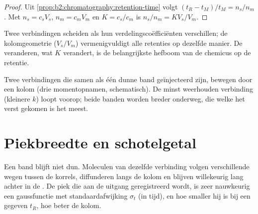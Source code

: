 \begin{proof}
Uit \cref{prop:b2:chromatography:retention-time} volgt $(t_R - t_M)/t_M = n_s/n_m$. Met $n_s = c_sV_s$,
$n_m = c_mV_m$ en $K = c_s/c_m$ is $n_s/n_m = KV_s/V_m$.
\end{proof}

Twee verbindingen scheiden als hun verdelingscoëfficiënten verschillen; de kolomgeometrie ($V_s/V_m$)
vermenigvuldigt alle retenties op dezelfde manier. De  veranderen, wat $K$ verandert, is de belangrijkste
hefboom van de chemicus op de retentie.

\begin{omfigure}
\par\vspace{4pt}

{\small Twee verbindingen die samen als één dunne band geïnjecteerd zijn, bewegen door een kolom (drie momentopnamen,
schematisch). De minst weerhouden verbinding (kleinere $k$) loopt voorop; beide banden worden breder onderweg, die
welke het verst gekomen is het meest.}
\end{omfigure}

\section{Piekbreedte en schotelgetal}

Een band blijft niet dun. Moleculen van dezelfde verbinding volgen verschillende wegen tussen de korrels,
diffunderen langs de kolom en blijven willekeurig lang achter in de . De piek die aan
de uitgang geregistreerd wordt, is zeer nauwkeurig een gaussfunctie met standaardafwijking $\sigma_t$ (in tijd), en hoe smaller hij is
bij een gegeven $t_R$, hoe beter de kolom.

